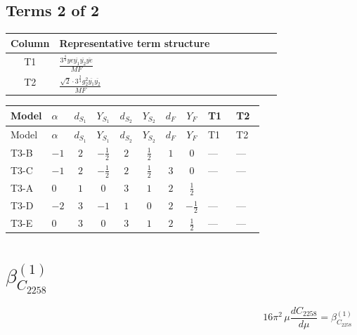 \documentclass[8pt]{article}
\begin{document}
\begin{landscape}
\subsection*{Terms 2 of 2}
\begin{center}
\begin{tabular}{@{}c >{\raggedright\arraybackslash}p{0.82\linewidth}@{}}
\toprule
Column & Representative term structure \\
\midrule
T1 & \(\displaystyle \frac{3^{\frac{3}{4}} ye \overline{y_{1}} \overline{y_{2}} \overline{ye}}{MF}\) \\
\midrule
T2 & \(\displaystyle \frac{\sqrt{2} \cdot 3^{\frac{3}{4}} g_{2}^{2} \overline{y_{1}} \overline{y_{2}}}{MF}\) \\
\midrule
\bottomrule
\end{tabular}
\end{center}
\smallskip
\tiny
\begin{longtable}{@{}llcccccc >{\raggedright\arraybackslash}p{0.21\linewidth} >{\raggedright\arraybackslash}p{0.21\linewidth}@{}}
\toprule
Model & $\alpha$ & $d_{S_1}$ & $Y_{S_1}$ & $d_{S_2}$ & $Y_{S_2}$ & $d_F$ & $Y_F$ & T1 & T2 \\
\midrule
\endfirsthead
\toprule
Model & $\alpha$ & $d_{S_1}$ & $Y_{S_1}$ & $d_{S_2}$ & $Y_{S_2}$ & $d_F$ & $Y_F$ & T1 & T2 \\
\midrule
\endhead
T3-B & $-1$ & $2$ & $-\frac{1}{2}$ & $2$ & $\frac{1}{2}$ & $1$ & $0$ & --- & --- \\
\midrule
T3-C & $-1$ & $2$ & $-\frac{1}{2}$ & $2$ & $\frac{1}{2}$ & $3$ & $0$ & --- & --- \\
\midrule
T3-A & $0$ & $1$ & $0$ & $3$ & $1$ & $2$ & $\frac{1}{2}$ & \scriptsize\adjustbox{max width=\linewidth}{$\begin{gathered} - \frac{3^{\frac{3}{4}} ye \overline{y_{1}} \overline{y_{2}} \overline{ye}}{12 MF}\end{gathered}$} & \scriptsize\adjustbox{max width=\linewidth}{$\begin{gathered} \frac{\sqrt{2} \cdot 3^{\frac{3}{4}} g_{2}^{2} \overline{y_{1}} \overline{y_{2}}}{3 MF}\end{gathered}$} \\
\midrule
T3-D & $-2$ & $3$ & $-1$ & $1$ & $0$ & $2$ & $-\frac{1}{2}$ & --- & --- \\
\midrule
T3-E & $0$ & $3$ & $0$ & $3$ & $1$ & $2$ & $\frac{1}{2}$ & --- & --- \\
\midrule
\bottomrule
\end{longtable}
\clearpage
\section*{$\beta_{C_{2258}}^{(1)}$}
\[16\pi^2\,\mu\frac{d C_{2258}}{d\mu}=\beta_{C_{2258}}^{(1)}\]

\end{landscape}
\end{document}
